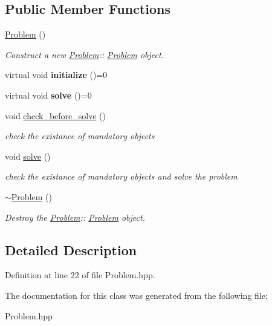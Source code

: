 \subsection*{Public Member Functions}
\begin{DoxyCompactItemize}
\item 
\mbox{\label{classProblem_ad9d44f0ef936fb62f0ce41dd200494ac}} 
\hyperlink{classProblem_ad9d44f0ef936fb62f0ce41dd200494ac}{Problem} ()
\begin{DoxyCompactList}\small\item\em Construct a new \hyperlink{classProblem}{Problem}\+:\+: \hyperlink{classProblem}{Problem} object. \end{DoxyCompactList}\item 
\mbox{\label{classProblem_ae9601fa8f7ec8dc39d76f4da6f46284b}} 
virtual void {\bfseries initialize} ()=0
\item 
\mbox{\label{classProblem_a6060cada9aac7d61fc52155ab392660d}} 
virtual void {\bfseries solve} ()=0
\item 
\mbox{\label{classProblem_a3d125ea7eee91e48316554d9dba37c5b}} 
void \hyperlink{classProblem_a3d125ea7eee91e48316554d9dba37c5b}{check\+\_\+before\+\_\+solve} ()
\begin{DoxyCompactList}\small\item\em check the existance of mandatory objects \end{DoxyCompactList}\item 
\mbox{\label{classProblem_a457a3efef1d18906da44294d2982317e}} 
void \hyperlink{classProblem_a457a3efef1d18906da44294d2982317e}{solve} ()
\begin{DoxyCompactList}\small\item\em check the existance of mandatory objects and solve the problem \end{DoxyCompactList}\item 
\mbox{\label{classProblem_a839a525ed01c34d57fff42583003d3e7}} 
\hyperlink{classProblem_a839a525ed01c34d57fff42583003d3e7}{$\sim$\+Problem} ()
\begin{DoxyCompactList}\small\item\em Destroy the \hyperlink{classProblem}{Problem}\+:\+: \hyperlink{classProblem}{Problem} object. \end{DoxyCompactList}\end{DoxyCompactItemize}


\subsection{Detailed Description}


Definition at line 22 of file Problem.\+hpp.



The documentation for this class was generated from the following file\+:\begin{DoxyCompactItemize}
\item 
Problem.\+hpp\end{DoxyCompactItemize}
